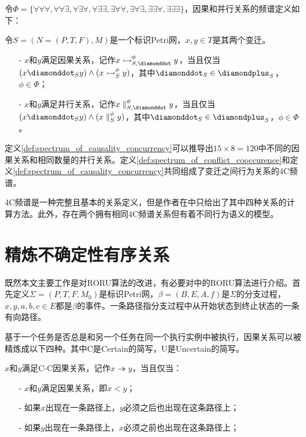 令$\Phi=\{\forall\forall\forall,\forall\forall\exists,\forall\exists\forall,\forall\exists\exists,\exists\forall\forall,\exists\forall\exists,\exists\exists\forall,\exists\exists\exists\}$，因果和并行关系的频谱定义如下：
\begin{definition}[因果和并行关系的频谱]\label{def:spectrum_of_causality_concurrency}
令$S=(N=(P,T,F),M)$是一个标识Petri网，$x,y\in T$是其两个变迁。
  \begin{itemize}
    \item[-] $x$和$y$满足因果关系，记作$x\rightarrowtail_{S,\diamonddot}^{\phi}y$，当且仅当\\
    $(x\diamonddot_{S}y)\wedge(x\rightarrowtail_{S}^{\phi}y)$，其中$\diamonddot_{S}\in\diamondplus_{S}$，$\phi\in\Phi$；
    \item[-] $x$和$y$满足并行关系，记作$x\parallel_{S,\diamonddot}^{\phi}y$，当且仅当\\
    $(x\diamonddot_{S}y)\wedge(x\parallel_{S}^{\phi}y)$，其中$\diamonddot_{S}\in\diamondplus_{S}$，$\phi\in\Phi$。
  \end{itemize}
\end{definition}
定义\ref{def:spectrum_of_causality_concurrency}可以推导出$15\times 8=120$中不同的因果关系和相同数量的并行关系。定义\ref{def:spectrum_of_conflict_cooccurence}和定义\ref{def:spectrum_of_causality_concurrency}共同组成了变迁之间行为关系的4C频谱。

4C频谱是一种完整且基本的关系定义，但是作者在中只给出了其中四种关系的计算方法。此外，存在两个拥有相同4C频谱关系但有着不同行为语义的模型\cite{armas2014suitability}。

\section{精炼不确定性有序关系}\label{sec:roru}
既然本文主要工作是对RORU算法的改进，有必要对中的RORU算法进行介绍。首先定义$\Sigma=(P,T,F,M_{0})$是标识Petri网，$\beta=(B,E,A,f)$是$\Sigma$的分支过程，$x,y,a,b,c\in E$都是$\beta$的事件。一条路径指分支过程中从开始状态到终止状态的一条有向路径。

基于一个任务是否总是和另一个任务在同一个执行实例中被执行，因果关系可以被精炼成以下四种。其中C是Certain的简写，U是Uncertain的简写。

\begin{definition}\label{def:c_c_causal}
$x$和$y$满足C-C因果关系，记作$x\twoheadrightarrow y$，当且仅当：
  \begin{itemize}
    \item[-] $x$和$y$满足因果关系，即$x<y$；
    \item[-] 如果$x$出现在一条路径上，$y$必须之后也出现在这条路径上；
    \item[-] 如果$y$出现在一条路径上，$x$必须之前也出现在这条路径上；
  \end{itemize}
\end{definition}

